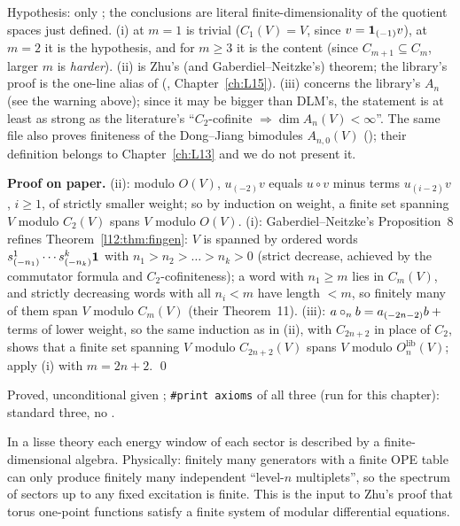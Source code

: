\begin{dictionary}
Hypothesis: only ; the conclusions are literal finite-dimensionality of the quotient spaces just
defined. (i) at $m = 1$ is trivial ($C_1(V) = V$, since $v = \mathbf{1}_{(-1)}v$), at $m = 2$ it is the hypothesis, and for $m\ge3$ it is the content (since $C_{m+1}\subseteq C_m$, larger $m$ is
\emph{harder}). (ii) is Zhu's (and Gaberdiel--Neitzke's) theorem; the library's proof is the one-line alias of
\allowbreak{}\allowbreak{}\allowbreak{} (,
Chapter~\ref{ch:L15}). (iii) concerns the library's $A_n$ (see the warning above); since it may be bigger than DLM's,
the statement is at least as strong as the literature's ``$C_2$-cofinite $\Rightarrow\dim A_n(V)<\infty$''. The same file
also proves finiteness of the Dong--Jiang bimodules $A_{n,0}(V)$ (\allowbreak{}\allowbreak{}\allowbreak{}); their
definition belongs to Chapter~\ref{ch:L13} and we do not present it.
\end{dictionary}

\textbf{Proof on paper.} (ii): modulo $O(V)$, $u_{(-2)}v$ equals $u\circ v$ minus terms $u_{(i-2)}v$, $i\ge1$, of strictly
smaller weight; so by induction on weight, a finite set spanning $V$ modulo $C_2(V)$ spans $V$ modulo $O(V)$. (i):
Gaberdiel--Neitzke's Proposition~8 refines Theorem~\ref{l12:thm:fingen}: $V$ is spanned by ordered words
$s^1_{(-n_1)}\cdots s^k_{(-n_k)}\mathbf{1}$ with $n_1>n_2>\dots>n_k>0$ (strict decrease, achieved by the commutator formula
and $C_2$-cofiniteness); a word with $n_1\ge m$ lies in $C_m(V)$, and strictly decreasing words with all $n_i<m$ have length
$<m$, so finitely many of them span $V$ modulo $C_m(V)$ (their Theorem~11). (iii): $a\circ_nb = a_{(-2n-2)}b + {}$terms of
lower weight, so the same induction as in (ii), with $C_{2n+2}$ in place of $C_2$, shows that a finite set spanning
$V$ modulo $C_{2n+2}(V)$ spans $V$ modulo $O_n^{\mathrm{lib}}(V)$; apply (i) with $m = 2n+2$. \qed

\begin{status}
Proved, unconditional given ; \texttt{\#print axioms} of all three (run for this chapter): standard three, no
.
\end{status}

\begin{physics}
In a lisse theory each energy window of each sector is described by a finite-dimensional algebra. Physically: finitely many
generators with a finite OPE table can only produce finitely many independent ``level-$n$ multiplets'', so the spectrum of
sectors up to any fixed excitation is finite. This is the input to Zhu's proof that torus one-point functions satisfy a
finite system of modular differential equations.
\end{physics}

